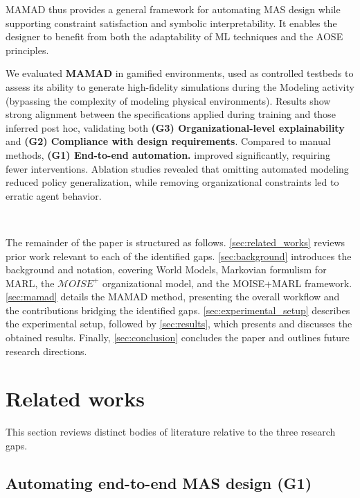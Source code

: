 \documentclass[pdflatex,sn-mathphys-num]{sn-jnl}%
\theoremstyle{thmstyleone}%
\theoremstyle{thmstyletwo}%
\theoremstyle{thmstylethree}%
\begin{document}
\noindent MAMAD thus provides a general framework for automating MAS design while supporting constraint satisfaction and symbolic interpretability. It enables the designer to benefit from both the adaptability of ML techniques and the AOSE principles.



We evaluated \textbf{MAMAD} in gamified environments, used as controlled testbeds to assess its ability to generate high-fidelity simulations during the Modeling activity (bypassing the complexity of modeling physical environments). Results show strong alignment between the specifications applied during training and those inferred post hoc, validating both \textbf{(G3) Organizational-level explainability} and \textbf{(G2) Compliance with design requirements}. Compared to manual methods, \textbf{(G1) End-to-end automation.} improved significantly, requiring fewer interventions. Ablation studies revealed that omitting automated modeling reduced policy generalization, while removing organizational constraints led to erratic agent behavior.

\

\noindent The remainder of the paper is structured as follows. \autoref{sec:related_works} reviews prior work relevant to each of the identified gaps. \autoref{sec:background} introduces the background and notation, covering World Models, Markovian formulism for MARL, the $\mathcal{M}OISE^+$ organizational model, and the MOISE+MARL framework. \autoref{sec:mamad} details the MAMAD method, presenting the overall workflow and the contributions bridging the identified gaps. \autoref{sec:experimental_setup} describes the experimental setup, followed by \autoref{sec:results}, which presents and discusses the obtained results. Finally, \autoref{sec:conclusion} concludes the paper and outlines future research directions.

\section{Related works}\label{sec:related_works}

This section reviews distinct bodies of literature relative to the three research gaps.

\subsection{Automating end-to-end MAS design (G1)}
\end{document}
